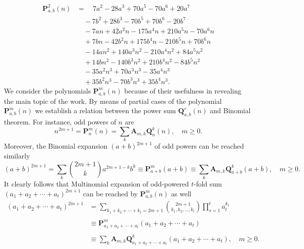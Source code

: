\documentclass[12pt, letterpaper]{amsart}
\theoremstyle{definition}
\theoremstyle{remark}
\numberwithin{equation}{section}
\begin{document}
\begin{equation*}
\begin{split}
\mathbf{P}^{2}_{a,b}(n)
&= \quad 7 a^2 - 28 a^3 + 70 a^5 - 70 a^6 + 20 a^7 \\
&\quad - 7 b^2 + 28 b^3 - 70 b^5 + 70 b^6 - 20 b^7 \\
&\quad - 7 a n + 42 a^2 n - 175 a^4 n + 210 a^5 n -70 a^6 n \\
&\quad + 7 b n - 42 b^2 n + 175 b^4 n - 210 b^5 n + 70 b^6 n \\
&\quad - 14 a n^2 + 140 a^3 n^2 - 210 a^4 n^2 + 84 a^5 n^2 \\
&\quad + 14 b n^2 - 140 b^3 n^2 + 210 b^4 n^2 - 84 b^5 n^2 \\
&\quad - 35 a^2 n^3 + 70 a^3 n^3 - 35 a^4 n^3 \\
&\quad + 35 b^2 n^3 - 70 b^3 n^3 + 35 b^4 n^3.
\end{split}
\end{equation*}
We consider the polynomials $\mathbf{P}^{m}_{a,b}(n)$ because of their usefulness in revealing the main topic of the work. By means of partial cases of the polynomial $\mathbf{P}^{m}_{a,b}(n)$ we establish a relation between the power sum $\mathbf{Q}^{r}_{a,b}(n)$ and Binomial theorem. For instance, odd powers of $n$ are
\begin{equation*}
n^{2m+1} = \mathbf{P}^{m}_{n}(n) = \sum\limits_{k}\mathbf{A}_{m,k}\mathbf{Q}^{k}_{n}(n), \quad m\geq 0.
\end{equation*}
Moreover, the Binomial expansion $(a+b)^{2m+1}$ of odd powers can be reached similarly
\begin{equation*}
(a+b)^{2m+1}=\sum_{k} \binom{2m+1}{k} a^{2m+1-k} b^k \equiv \mathbf{P}^{m}_{a+b}(a+b) \equiv \sum\limits_{k}\mathbf{A}_{m,k}\mathbf{Q}^{k}_{a+b}(a+b), \quad m\geq 0.
\end{equation*}
It clearly follows that Multinomial expansion of odd-powered $t$-fold sum $(a_1+a_2+\cdots+a_t)^{2m+1}$ can be reached by $\mathbf{P}^{m}_{a,b}(n)$ as well
\begin{equation*}
\begin{split}
(a_1+a_2+\cdots+a_t)^{2m+1} 
&=\sum_{k_1+k_2+\cdots+k_t=2m+1}\binom{2m+1}{k_1, k_2,\ldots, k_t} \prod_{s=1}^{t}a_t^{k_t} \\
\\
&\equiv\mathbf{P}^{m}_{a_1+a_2+\cdots+a_t}(a_1+a_2+\cdots+a_t)\\
\\
&\equiv\sum_{k}\mathbf{A}_{m,k}\mathbf{Q}^{k}_{a_1+a_2+\cdots+a_t}(a_1+a_2+\cdots+a_t), \quad m\geq 0.
\end{split}
\end{equation*}
\end{document}

